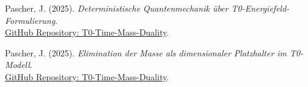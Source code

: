 \documentclass[12pt,a4paper]{article}
\begin{document}
\begin{thebibliography}{99}
		Pascher, J. (2025). \textit{Deterministische Quantenmechanik über T0-Energiefeld-Formulierung}. \\
		\href{https://github.com/jpascher/T0-Time-Mass-Duality/blob/main/2/pdf/QM-DetrmisticEn.pdf}{GitHub Repository: T0-Time-Mass-Duality}.
		
		Pascher, J. (2025). \textit{Elimination der Masse als dimensionaler Platzhalter im T0-Modell}. \\
		\href{https://github.com/jpascher/T0-Time-Mass-Duality/blob/main/2/pdf/EliminationOfMassEn.pdf}{GitHub Repository: T0-Time-Mass-Duality}.
		
	\end{thebibliography}
	
\end{document}
